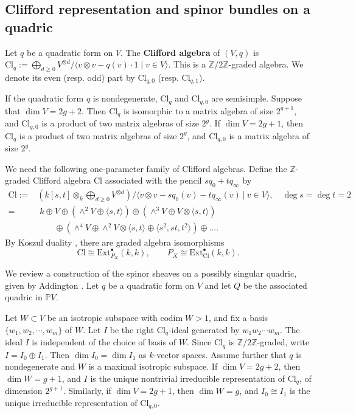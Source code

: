 \documentclass[12pt, letterpaper]{amsart}
\theoremstyle{definition}
\newcommand{\PP}{\mathbb{P} }
\newcommand{\ZZ}{\mathbb{Z} }
\def\codim{\mathrm{codim}}
\def\Ext{\mathrm{Ext} }
\def\Cl{\mathrm{Cl}}
\begin{document}
\subsection{Clifford representation and spinor bundles on a quadric}\label{ssec:spinor}

Let \(q\) be a quadratic form on \(V\). The \textbf{Clifford algebra} of \((V, q)\) is \(\Cl_q := \bigoplus_{d \ge 0}V^{\otimes d}/\langle v \otimes v - q(v)\cdot1\mid v \in V\rangle\). This is a \(\ZZ/2\ZZ\)-graded algebra. We denote its even (resp. odd) part by \(\Cl_{q, 0}\) (resp. \(\Cl_{q, 1}\)).

If the quadratic form \(q\) is nondegenerate, \(\Cl_q\) and \(\Cl_{q,0}\) are semisimple. Suppose that \(\dim V = 2g + 2\). Then \(\Cl_q\) is isomorphic to a matrix algebra of size \(2^{g+1}\), and \(\Cl_{q,0}\) is a product of two matrix algebras of size \(2^g\). If \(\dim V = 2g+1\), then \(\Cl_q\) is a product of two matrix algebras of size \(2^g\), and \(\Cl_{q,0}\) is a matrix algebra of size \(2^g\).

We need the following one-parameter family of Clifford algebras. Define the \(\ZZ\)-graded Clifford algebra \(\Cl\) associated with the pencil \(sq_0+tq_\infty\) by
\begin{equation}\label{eqn:defCl}
\begin{split}
  \Cl:=&\left(k[s,t]\otimes_k\bigoplus_{d\ge0}V^{\otimes d}\right)/\langle v\otimes v-sq_0(v)-tq_\infty(v)\ |\ v\in V\rangle,\quad\deg s=\deg t=2\\
  =& \; k \oplus V \oplus \left(\wedge^2 V \oplus \langle s, t\rangle\right) \oplus\left(\wedge^3 V \oplus V \otimes \langle s, t\rangle\right) \\
  &\quad\quad \oplus \left(\wedge^4 V \oplus \wedge^2 V \otimes \langle s, t\rangle \oplus \langle s^2, st, t^2\rangle\right) \oplus \dots.
\end{split}
\end{equation}
By Koszul duality \cite[Theorem~3.1]{ES25}, there are graded algebra isomorphisms
\[\Cl\cong\Ext^\bullet_{P_X}(k,k),\qquad P_X\cong\Ext^\bullet_{\Cl}(k,k).\]

We review a construction of the spinor sheaves on a possibly singular quadric, given by Addington \cite{Add11}. Let \(q\) be a quadratic form on \(V\) and let \(Q\) be the associated quadric in \(\PP V\).

Let \(W \subset V\) be an isotropic subspace with \(\codim\; W > 1\), and fix a basis \(\{w_1, w_2, \cdots, w_m\}\) of \(W\). Let \(I\) be the right \(\Cl_q\)-ideal generated by \(w_1 w_2 \cdots w_m\). The ideal \(I\) is independent of the choice of basis of \(W\). Since \(\Cl_q\) is \(\ZZ/2\ZZ\)-graded, write \(I = I_0 \oplus I_1\). Then \(\dim I_0 = \dim I_1\) as \(k\)-vector spaces. Assume further that \(q\) is nondegenerate and \(W\) is a maximal isotropic subspace. If \(\dim V = 2g+2\), then \(\dim W = g+1\), and \(I\) is the unique nontrivial irreducible representation of \(\Cl_q\), of dimension \(2^{g+1}\). Similarly, if \(\dim V = 2g+1\), then \(\dim W = g\), and \(I_0 \cong I_1\) is the unique irreducible representation of \(\Cl_{q,0}\).
\end{document}
